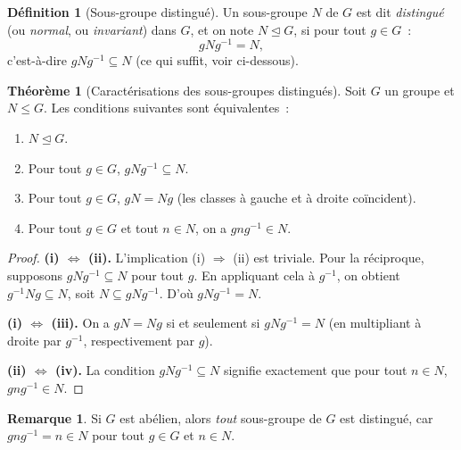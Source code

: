 \documentclass[12pt,a4paper,openany]{book}
\theoremstyle{definition}
\newtheorem{definition}{Définition}[chapter]
\newtheorem{theoreme}{Théorème}[chapter]
\newtheorem{remarque}{Remarque}[chapter]
\newcommand{\normal}{\trianglelefteq}
\begin{document}
\begin{definition}[Sous-groupe distingué]
\label{def:distingue}
Un sous-groupe $N$ de $G$ est dit \emph{distingué} (ou \emph{normal}, ou
\emph{invariant}) dans $G$, et on note $N \normal G$, si pour tout $g \in G$~:
\[
  gNg^{-1} = N,
\]
c'est-à-dire $gNg^{-1} \subseteq N$ (ce qui suffit, voir ci-dessous).
\end{definition}

\begin{theoreme}[Caractérisations des sous-groupes distingués]
\label{thm:caract-distingue}
Soit $G$ un groupe et $N \leq G$. Les conditions suivantes sont équivalentes~:
\begin{enumerate}[label=(\roman*)]
  \item $N \normal G$.
  \item Pour tout $g \in G$, $gNg^{-1} \subseteq N$.
  \item Pour tout $g \in G$, $gN = Ng$ \textup{(les classes à gauche et à droite
    coïncident)}.
  \item Pour tout $g \in G$ et tout $n \in N$, on a $gng^{-1} \in N$.
\end{enumerate}
\end{theoreme}

\begin{proof}
\textbf{(i) $\Leftrightarrow$ (ii).} L'implication (i) $\Rightarrow$ (ii) est triviale.
Pour la réciproque, supposons $gNg^{-1} \subseteq N$ pour tout $g$. En appliquant cela
à $g^{-1}$, on obtient $g^{-1}Ng \subseteq N$, soit $N \subseteq gNg^{-1}$.
D'où $gNg^{-1} = N$.

\textbf{(i) $\Leftrightarrow$ (iii).} On a $gN = Ng$ si et seulement si
$gNg^{-1} = N$ (en multipliant à droite par $g^{-1}$, respectivement par $g$).

\textbf{(ii) $\Leftrightarrow$ (iv).} La condition $gNg^{-1} \subseteq N$ signifie
exactement que pour tout $n \in N$, $gng^{-1} \in N$.
\end{proof}

\begin{remarque}
\label{rem:abelien-distingue}
Si $G$ est abélien, alors \emph{tout} sous-groupe de $G$ est distingué, car $gng^{-1} =
n \in N$ pour tout $g \in G$ et $n \in N$.
\end{remarque}
\end{document}
